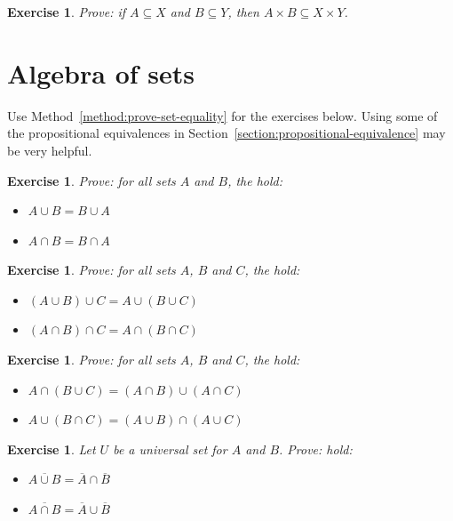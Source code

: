 \documentclass{book}
\newcounter{ekcounter}%
\theoremstyle{ekimcustom}
\newtheorem{exercise}[ekcounter]{Exercise}
\newcommand\defn[1]{{\color{blue}{\bf #1}}}
\begin{document}
\begin{exercise}
Prove: if $A \subseteq X$ and $B \subseteq Y$, then $A \times B \subseteq X \times Y$.
\end{exercise}

\section{Algebra of sets}

Use Method~\ref{method:prove-set-equality} for the exercises below. Using some of the propositional equivalences in Section~\ref{section:propositional-equivalence} may be very helpful.

\begin{exercise}
Prove: for all sets $A$ and $B$, the \defn{commutative laws} hold:
\begin{itemize}
\item $A \cup B= B \cup A$
\item $A \cap B = B \cap A$
\end{itemize}
\end{exercise}

\begin{exercise}
Prove: for all sets $A$, $B$ and $C$, the \defn{associative laws} hold:
\begin{itemize}
\item $(A \cup B) \cup C= A \cup (B \cup C)$
\item $(A \cap B) \cap C= A \cap (B \cap C)$
\end{itemize}
\end{exercise}

\begin{exercise}
Prove: for all sets $A$, $B$ and $C$, the \defn{distributive laws} hold:
\begin{itemize}
\item $A \cap (B \cup C) = (A \cap B) \cup (A \cap C)$
\item $A \cup (B \cap C) = (A \cup B) \cap (A \cup C)$
\end{itemize}
\end{exercise}

\begin{exercise}
Let $U$ be a universal set for $A$ and $B$. Prove: \defn{De Morgan's laws} hold:
\begin{itemize}
\item $\overline{A \cup B} = \overline{A} \cap \overline{B}$
\item $\overline{A \cap B} = \overline{A} \cup \overline{B}$
\end{itemize}
\end{exercise}
\end{document}
